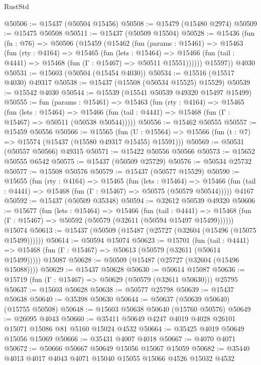\begin{lexlean}{RustStd}
\begin{coremodule}
@50506 := @15437 (@50504 @15456)
@50508 := @15479 (@15480 @2974)
@50509 := @15475 @50508
@50511 := @15437 (@50509 @15504)
@50528 := @15436
    (fun (fn : @76) =>
    @50506
      (@15459
        (@15462
          (fun (params : @15461) =>
          @15463
            (fun (rty : @4164) =>
            @15465
              (fun (lets : @15464) =>
              @15466 (fun (tail : @4441) => @15468 (fun (Γ : @15467) => @50511 @15551))))))
        @15597))
    @4030
@50531 := @15603 (@50504 (@15454 @4030))
@50534 := @15516 (@15517 @4030) @49317
@50538 := @15437 (@15508 (@50534 @15525) @15529)
@50539 := @15542 @4030
@50544 := @15539 (@15541 @50539 @49320 @15497 @15499)
@50555 := fun (params : @15461) =>
  @15463
    (fun (rty : @4164) =>
    @15465
      (fun (lets : @15464) =>
      @15466 (fun (tail : @4441) => @15468 (fun (Γ : @15467) => @50511 (@50538 @50544)))))
@50556 := @15462 @50555
@50557 := @15459 @50556
@50566 := @15565
    (fun (U : @15564) => @15566 (fun (t : @7) => @15574 (@15437 (@15580 @49317 @15455) @15591)))
@50569 := @50531 (@50557 @50566) @49315
@50571 := @15422 @50556 @50566
@50573 := @15652 @50555 @6542
@50575 := @15437 (@50509 @25729)
@50576 := @50534 @25732
@50577 := @15508 @50576
@50579 := @15437 (@50577 @15529)
@50590 := @15655
    (fun (rty : @4164) =>
    @15465
      (fun (lets : @15464) =>
      @15466 (fun (tail : @4441) => @15468 (fun (Γ : @15467) => @50575 (@50579 @50544)))))
    @4167
@50592 := @15437 (@50509 @35348)
@50594 := @32612 @50539 @49320
@50606 := @15677
    (fun (lets : @15464) =>
    @15466
      (fun (tail : @4441) =>
      @15468 (fun (Γ : @15467) => @50592 (@50579 (@32611 (@50594 @15497 @15499))))))
    @15074
@50613 := @15437 (@50509 (@15487 (@25727 (@32604 (@15496 (@15075 @15499))))))
@50614 := @50594 @15074
@50623 := @15701
    (fun (tail : @4441) => @15468 (fun (Γ : @15467) => @50613 (@50579 (@32611 (@50614 @15499)))))
    @15087
@50628 := @50509 (@15487 (@25727 (@32604 (@15496 @15088))))
@50629 := @15437 @50628
@50630 := @50614 @15087
@50636 := @15719 (fun (Γ : @15467) => @50629 (@50579 (@32611 @50630))) @25795
@50637 := @15603 @50628
@50638 := @50577 @25798
@50639 := @15437 @50638
@50640 := @35398 @50630
@50644 := @50637 (@50639 @50640) (@15755 @50508)
@50648 := @15603 @50638 @50640 (@15760 @50576)
@50649 := @26095 @4043
@50660 := @35411 @50649 @4247 @4019 @4028 @26101 @15071 @15086 @81 @5160 @15024 @4532
@50664 := @35425 @4019 @50649 @15056 @15069
@50666 := @35431 @4007 @4018
@50667 := @4070 @4071
@50672 := @50666 @50667 @50649 @15056 @15067 @15059
@50682 := @35440 @4013 @4017 @4043 @4071 @15040 @15055 @15066 @4526 @15032 @4532

\end{coremodule}
\end{lexlean}

